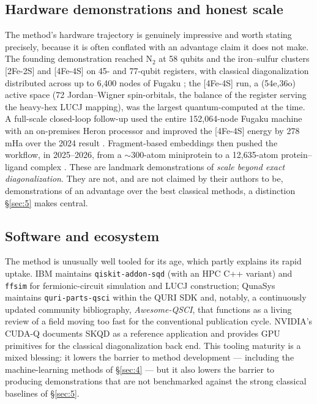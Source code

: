 \documentclass[11pt]{article}
\begin{document}
\subsection{Hardware demonstrations and honest scale}\label{sec:2-3}

The method's hardware trajectory is genuinely impressive and worth stating precisely, because it is often conflated with an advantage claim it does not make. The founding demonstration reached N$_2$ at 58 qubits and the iron--sulfur clusters [2Fe-2S] and [4Fe-4S] on 45- and 77-qubit registers, with classical diagonalization distributed across up to 6,400 nodes of Fugaku \cite{robledomoreno2025}; the [4Fe-4S] run, a (54e,36o) active space (72 Jordan--Wigner spin-orbitals, the balance of the register serving the heavy-hex LUCJ mapping), was the largest quantum-computed at the time. A full-scale closed-loop follow-up used the entire 152,064-node Fugaku machine with an on-premises Heron processor and improved the [4Fe-4S] energy by 278 mHa over the 2024 result \cite{shirakawa2025}. Fragment-based embeddings then pushed the workflow, in 2025--2026, from a $\sim$300-atom miniprotein to a 12,635-atom protein--ligand complex \cite{wang2026}. These are landmark demonstrations of \emph{scale beyond exact diagonalization}. They are not, and are not claimed by their authors to be, demonstrations of an advantage over the best classical methods, a distinction \S\ref{sec:5} makes central.


\subsection{Software and ecosystem}\label{sec:2-4}

The method is unusually well tooled for its age, which partly explains its rapid uptake. IBM maintains \texttt{qiskit-addon-sqd} (with an HPC C++ variant) and \texttt{ffsim} for fermionic-circuit simulation and LUCJ construction; QunaSys maintains \texttt{quri-parts-qsci} within the QURI SDK and, notably, a continuously updated community bibliography, \emph{Awesome-QSCI}, that functions as a living review of a field moving too fast for the conventional publication cycle. NVIDIA's CUDA-Q documents SKQD as a reference application and provides GPU primitives for the classical diagonalization back end. This tooling maturity is a mixed blessing: it lowers the barrier to method development --- including the machine-learning methods of \S\ref{sec:4} --- but it also lowers the barrier to producing demonstrations that are not benchmarked against the strong classical baselines of \S\ref{sec:5}.
\end{document}
